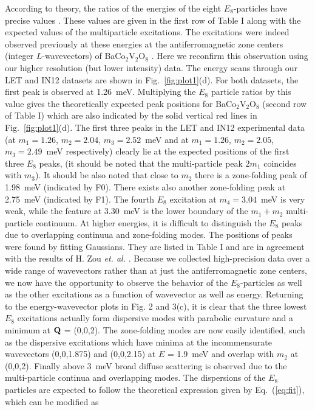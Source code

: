 \documentclass[aps,prl,twocolumn,superscriptaddress,groupedaddress]{revtex4}
\begin{document}
According to theory, the ratios of the energies of the eight $E_8$-particles have precise values \cite{borthwick2011did}. These values are given in the first row of Table I along with the expected values of the multiparticle excitations. The excitations were indeed observed previously at these energies at the antiferromagnetic zone centers (integer $L$-wavevectors) of BaCo$_2$V$_2$O$_8$ \cite{Zou_2021}. Here we reconfirm this observation using our higher resolution (but lower intensity) data. The energy scans through our LET and IN12 datasets are shown in Fig.~\ref{fig:plot1}(d). For both datasets, the first peak is observed at 1.26~meV. Multiplying the $E_8$ particle ratios by this value gives the theoretically expected peak positions for BaCo$_2$V$_2$O$_8$ (second row of Table I) which are also indicated by the solid vertical red lines in Fig.~\ref{fig:plot1}(d). The first three peaks in the LET and IN12 experimental data (at $m_1 = 1.26$, $m_2 = 2.04$, $m_3 = 2.52$~meV and at $m_1 = 1.26$, $m_2 = 2.05$, $m_3 = 2.49$~meV respectively) clearly lie at the expected positions of the first three $E_8$ peaks, (it should be noted that the multi-particle peak $2m_1$ coincides with $m_3$). It should be also noted that close to $m_2$ there is a zone-folding peak of 1.98~meV (indicated by F0). There exists also another zone-folding peak at 2.75~meV (indicated by F1). The fourth $E_8$ excitation at $m_4 = 3.04$~meV is very weak, while the feature at 3.30~meV is the lower boundary of the $m_1+m_2$ multi-particle continuum. At higher energies, it is difficult to distinguish the $E_8$ peaks due to overlapping continuua and zone-folding modes. The positions of peaks were found by fitting Gaussians. They are listed in Table I and are in agreement with the results of H. Zou {\it et. al.} \cite{Zou_2021}. Because we collected high-precision data over a wide range of wavevectors rather than at just the antiferromagnetic zone centers, we now have the opportunity to observe the behavior of the $E_8$-particles as well as the other excitations as a function of wavevector as well as energy. Returning to the energy-wavevector plots in Fig. 2 and 3(c), it is clear that the three lowest $E_8$ excitations actually form dispersive modes with parabolic curvature and a minimum at ${\bf Q}$ = (0,0,2). The zone-folding modes are now easily identified, such as the dispersive excitations which have minima at the incommensurate wavevectors (0,0,1.875) and (0,0,2.15) at $E$ = 1.9~meV and overlap with $m_2$ at (0,0,2). Finally above 3~meV broad diffuse scattering is observed due to the multi-particle continua and overlapping modes. The dispersions of the $E_8$ particles are expected to follow the theoretical expression given by Eq.~(\ref{eq:fit}), which can be modified as
\end{document}
